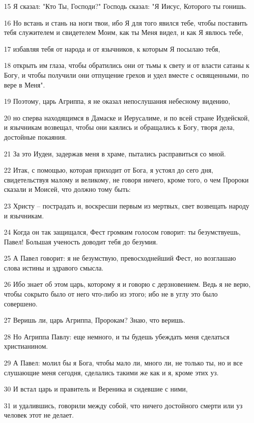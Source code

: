 15 Я сказал: "Кто Ты, Господи?" Господь сказал: "Я Иисус, Которого ты гонишь.

16 Но встань и стань на ноги твои, ибо Я для того явился тебе, чтобы поставить тебя служителем и свидетелем Моим, как ты Меня видел, и как Я явлюсь тебе,

17 избавляя тебя от народа и от язычников, к которым Я посылаю тебя,

18 открыть им глаза, чтобы обратились они от тьмы к свету и от власти сатаны к Богу, и чтобы получили они отпущение грехов и удел вместе с освященными, по вере в Меня".

19 Поэтому, царь Агриппа, я не оказал непослушания небесному видению,

20 но сперва находящимся в Дамаске и Иерусалиме, и по всей стране Иудейской, и язычникам возвещал, чтобы они каялись и обращались к Богу, творя дела, достойные покаяния.

21 За это Иудеи, задержав меня в храме, пытались расправиться со мной.

22 Итак, с помощью, которая приходит от Бога, я устоял до сего дня, свидетельствуя малому и великому, не говоря ничего, кроме того, о чем Пророки сказали и Моисей, что должно тому быть:

23 Христу – пострадать и, воскресши первым из мертвых, свет возвещать народу и язычникам.

24 Когда он так защищался, Фест громким голосом говорит: ты безумствуешь, Павел! Большая ученость доводит тебя до безумия.

25 А Павел говорит: я не безумствую, превосходнейший Фест, но возглашаю слова истины и здравого смысла.

26 Ибо знает об этом царь, которому я и говорю с дерзновением. Ведь я не верю, чтобы сокрыто было от него что-либо из этого; ибо не в углу это было совершено.

27 Веришь ли, царь Агриппа, Пророкам? Знаю, что веришь.

28 Но Агриппа Павлу: еще немного, и ты будешь убеждать меня сделаться христианином.

29 А Павел: молил бы я Бога, чтобы мало ли, много ли, не только ты, но и все слушающие меня сегодня, сделались такими же как и я, кроме этих уз.

30 И встал царь и правитель и Вереника и сидевшие с ними,

31 и удалившись, говорили между собой, что ничего достойного смерти или уз человек этот не делает.


